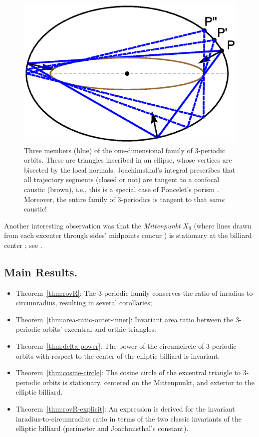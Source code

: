 \documentclass{amsart}
\theoremstyle{definition}
\begin{document}
\begin{figure}[H]
    \centering
    \includegraphics[width=.5\textwidth]{1020_three_orbits_proofs}
    \caption{Three members (blue) of the one-dimensional family of 3-periodic orbits. These are triangles inscribed in an ellipse, whose vertices are bisected by the local normals. Joachimsthal's integral \cite{sergei91} prescribes that all trajectory segments (closed or not) are tangent to a confocal caustic (brown), i.e., this is a special case of Poncelet's porism \cite{dragovic88}. Moreover, the entire family of 3-periodics is tangent to that {\em same} caustic!}
    \label{fig:three-orbits-proof}
\end{figure}

Another interesting observation was that the {\em Mittenpunkt} $X_9$ (where lines drawn from each excenter through sides' midpoints concur \cite[Mittenpunkt]{mw}) is stationary at the billiard center \cite{reznik2019-intelligencer}; see \cite[PL\#02]{reznik2020-playlist-proofs}. \\

\subsection{Main Results.}

\begin{itemize}
    \item Theorem~\ref{thm:rovR}: The 3-periodic family conserves the ratio of inradius-to-circumradius, resulting in several corollaries;
    \item Theorem~\ref{thm:area-ratio-outer-inner}: Invariant area ratio between the 3-periodic orbits' excentral and orthic triangles.
    \item Theorem~\ref{thm:delta-power}: The power of the circumcircle of 3-periodic orbits with respect to the center of the elliptic billiard is invariant.
    \item Theorem~\ref{thm:cosine-circle}: 
    The cosine circle of the excentral triangle to 3-periodic orbits is stationary, centered on the Mittenpunkt, and exterior to the elliptic billiard.
    \item Theorem~\ref{thm:rovR-explicit}: An expression is derived for the invariant inradius-to-circumradius ratio in terms of the two classic invariants of the elliptic billiard (perimeter and Joachmisthal's constant).
\end{itemize}
\end{document}
